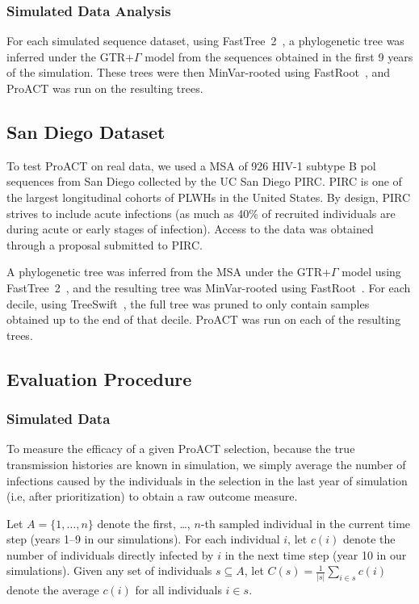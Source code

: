 \subsubsection{Simulated Data Analysis}
For each simulated sequence dataset, using FastTree~2~\cite{Price2010}, a phylogenetic tree was inferred under the \gls{GTR}+$\Gamma$ model from the sequences obtained in the first 9 years of the simulation. These trees were then MinVar-rooted using FastRoot~\cite{Mai2017}, and ProACT was run on the resulting trees.

\subsection{San Diego Dataset}
To test ProACT on real data, we used a \gls{MSA} of 926 \gls{HIV}-1 subtype B \gls{pol} sequences from San Diego collected by the UC San Diego \gls{PIRC}. \gls{PIRC} is one of the largest longitudinal cohorts of \glspl{PLWH} in the United States. By design, \gls{PIRC} strives to include acute infections (as much as 40\% of recruited individuals are during acute or early stages of infection). Access to the data was obtained through a proposal submitted to \gls{PIRC}.

A phylogenetic tree was inferred from the \gls{MSA} under the \gls{GTR}+$\Gamma$ model using FastTree~2~\cite{Price2010}, and the resulting tree was MinVar-rooted using FastRoot~\cite{Mai2017}. For each decile, using TreeSwift~\cite{Moshiri2018b}, the full tree was pruned to only contain samples obtained up to the end of that decile. ProACT was run on each of the resulting trees.

\subsection{Evaluation Procedure}
\subsubsection{Simulated Data}
To measure the efficacy of a given ProACT selection, because the true transmission histories are known in simulation, we simply average the number of infections caused by the individuals in the selection in the last year of simulation (i.e, after prioritization) to obtain a raw outcome measure.

Let $A=\{1,\ldots,n\}$ denote the first, \ldots, $n$-th sampled individual in the current time step (years 1--9 in our simulations). For each individual $i$, let $c(i)$ denote the number of individuals directly infected by $i$ in the next time step (year 10 in our simulations). Given any set of individuals $s\subseteq A$, let $C(s)=\frac{1}{|s|}\sum_{i\in s}{c(i)}$ denote the average $c(i)$ for all individuals $i\in s$.

